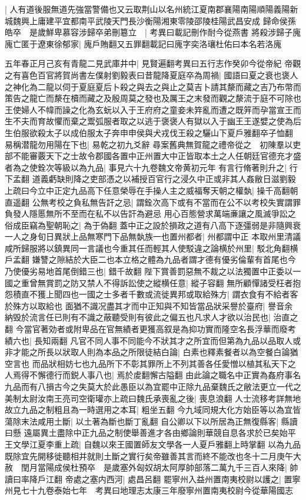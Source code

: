 |{
	人有道後服無道先強當警備也又云取荆山以名州統江夏南郡襄陽南陽順陽義陽新城魏興上庸建平宜都南平武陵天門長沙衡陽湘東零陵邵陵桂陽武昌安成}
歸命侯孫皓卒　是歲鮮卑慕容涉歸卒弟刪簒立　|{
	考異曰載記刪作耐今從燕書}
將殺涉歸子廆廆亡匿于遼東徐郁家|{
	廆戶賄翻又五罪翻載記曰廆字奕洛瓖杜佑曰本名若洛廆}


五年春正月己亥有青龍二見武庫井中|{
	見賢遍翻考異曰五行志作癸卯今從帝紀}
帝觀之有喜色百官將賀尚書左僕射劉毅表曰昔龍降夏庭卒為周禍|{
	國語曰夏之衰也褒人之神化為二龍以伺于夏庭夏后卜殺之與去之與止之莫吉卜請其漦而藏之吉乃布幣而策告之龍亡而漦在櫝而藏之及殷周莫之發也及厲王之末發而觀之漦流于庭不可除也王使婦人不幃而譟之化為玄蚖以入于王府府之童妾未筓亂而遭之既笄而孕當宣王而生不夫而育故懼而棄之鬻弧服者取之以逃于褒褒人有獄以入于幽王王遂嬖之使為后生伯服欲殺太子以成伯服太子奔申申侯與犬戎伐王殺之驪山下夏戶雅翻卒子恤翻}
易稱潜龍勿用陽在下也|{
	易乾之初九爻辭}
尋案舊典無賀龍之禮帝從之　初陳羣以吏部不能審覈天下之士故令郡國各置中正州置大中正皆取本土之人任朝廷官德充才盛者為之使銓次等級以為九品|{
	事見六十九卷魏文帝黄初元年}
有言行脩著則升之|{
	行下孟翻}
道義虧缺則降之吏部憑之以補授百官行之浸久中正或非其人姦敝日滋劉毅上疏曰今立中正定九品高下任意榮辱在手操人主之威福奪天朝之權埶|{
	操千高翻朝直遥翻}
公無考校之負私無告訐之忌|{
	謂銓次高下或有不當而在公不以考校失實謂罪負發人隱慝無所不至而在私不以告訐為避忌}
用心百態營求萬端亷讓之風滅爭訟之俗成臣竊為聖朝恥之|{
	為于偽翻}
蓋中正之設於損政之道有八高下逐彊弱是非隨興衰一人之身旬日異狀上品無寒門下品無埶族一也置州都者|{
	州都謂中正}
本取州里清議咸所歸服將以鎮異同一言議也今重其任而輕其人使駁違之論横於州里|{
	駁北角翻横戶孟翻}
嫌讐之隙結於大臣二也本立格之體為九品者謂才德有優劣倫輩有首尾也今乃使優劣易地首尾倒錯三也|{
	錯千故翻}
陛下賞善罰惡無不裁之以法獨置中正委以一國之重曾無賞罰之防又禁人不得訴訟使之縱横任意|{
	縱子容翻}
無所顧憚諸受枉者抱怨積直不獲上聞四也一國之士多者千數或流徙異邦或取給殊方|{
	謂衣食有不給者客於殊方以取給也}
面猶不識况盡其才而中正知與不知皆當品狀采譽於臺府|{
	譽音余}
納毁於流言任已則有不識之蔽聽受則有彼此之偏五也凡求人才欲以治民也|{
	治直之翻}
今當官著効者或附卑品在官無績者更獲高叙是為抑功實而隆空名長浮華而廢考績六也|{
	長知兩翻}
凡官不同人事不同能今不狀其才之所宜而但第為九品以品取人或非才能之所長以狀取人則為本品之所限徒結白論|{
	白素也釋素餐者以為空餐白論猶空言也}
而品狀相妨七也九品所下不彰其罪所上不列其善各任愛憎以植其私天下之人焉得不懈德行而鋭人事八也|{
	焉於䖍翻懈古隘翻}
由此論之職名中正實為姦府事名九品而有八損古今之失莫大於此愚臣以為宜罷中正除九品棄魏氏之敝法更立一代之美制太尉汝南王亮司空衛瓘亦上疏曰魏氏承喪亂之後|{
	喪息浪翻}
人士流移考詳無地故立九品之制粗且為一時選用之本耳|{
	粗坐五翻}
今九域同規大化方始臣等以為宜皆蕩除末法咸用土斷|{
	以土著為斷也斷丁亂翻}
自公卿以下以所居為正無復縣客|{
	縣讀曰懸}
遠屬異土盡除中正九品之制使舉善進才各由鄉論則華競自息各求於已矣始平王文學江夏李重上疏|{
	自魏以來王國置師友文學各一人夏戶雅翻上時掌翻}
以為九品既除宜先開移徙聽相并就則土斷之實行矣帝雖善其言而終不能改也冬十二月庚午大赦　閏月當陽成侯杜預卒　是歲塞外匈奴胡太阿厚帥部落二萬九千三百人來降|{
	帥讀曰率降戶江翻}
帝處之塞内西河|{
	處昌呂翻}
罷寧州入益州置南夷校尉以護之|{
	置寧州見七十九卷泰始七年　考異曰地理志太康三年廢寧州置南夷校尉今從華陽國志}


